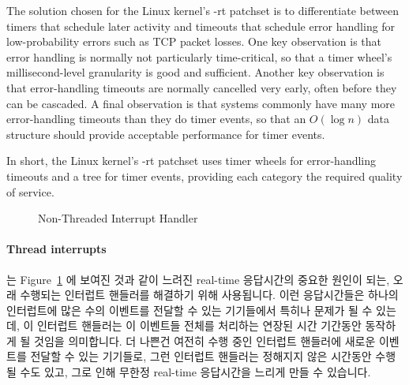 The solution chosen for the Linux kernel's -rt patchset is to differentiate
between timers that schedule later activity and timeouts that schedule
error handling for low-probability errors such as TCP packet losses.
One key observation is that error handling is normally not particularly
time-critical, so that a timer wheel's millisecond-level granularity
is good and sufficient.
Another key observation is that error-handling timeouts are normally
cancelled very early, often before they can be cascaded.
A final observation is that systems commonly have many more error-handling
timeouts than they do timer events, so that an $O(\log n)$
data structure should provide acceptable performance for timer events.

In short, the Linux kernel's -rt patchset uses timer wheels for
error-handling timeouts and a tree for timer events, providing each
category the required quality of service.
\fi

\begin{figure}[tb]
\centering
{}
\caption{Non-Threaded Interrupt Handler}
\label{fig:rt:Non-Threaded Interrupt Handler}
\end{figure}

\paragraph{Thread interrupts}
는
Figure~\ref{fig:rt:Non-Threaded Interrupt Handler} 에 보여진 것과 같이
느려진 real-time 응답시간의 중요한 원인이 되는, 오래 수행되는 인터럽트 핸들러를
해결하기 위해 사용됩니다.
이런 응답시간들은 하나의 인터럽트에 많은 수의 이벤트를 전달할 수 있는
기기들에서 특히나 문제가 될 수 있는데, 이 인터럽트 핸들러는 이 이벤트들 전체를
처리하는 연장된 시간 기간동안 동작하게 될 것임을 의미합니다.
더 나쁜건 여전히 수행 중인 인터럽트 핸들러에 새로운 이벤트를 전달할 수 있는
기기들로, 그런 인터럽트 핸들러는 정해지지 않은 시간동안 수행될 수도 있고, 그로
인해 무한정 real-time 응답시간을 느리게 만들 수 있습니다.

